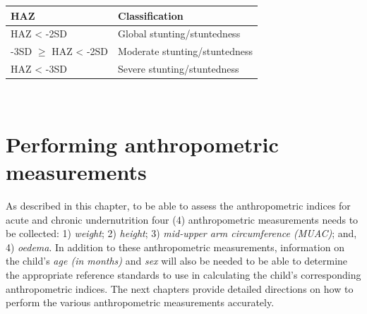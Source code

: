 \documentclass[12pt,]{book}
\theoremstyle{definition}
\theoremstyle{definition}
\theoremstyle{definition}
\theoremstyle{remark}
\begin{document}
\begin{longtable}[]{@{}ll@{}}
\toprule
\begin{minipage}[b]{0.34\columnwidth}\raggedright
\textbf{HAZ}\strut
\end{minipage} & \begin{minipage}[b]{0.47\columnwidth}\raggedright
\textbf{Classification}\strut
\end{minipage}\tabularnewline
\midrule
\endhead
\begin{minipage}[t]{0.34\columnwidth}\raggedright
HAZ \textless{} -2SD\strut
\end{minipage} & \begin{minipage}[t]{0.47\columnwidth}\raggedright
Global stunting/stuntedness\strut
\end{minipage}\tabularnewline
\begin{minipage}[t]{0.34\columnwidth}\raggedright
-3SD \(\geq\) HAZ \textless{} -2SD\strut
\end{minipage} & \begin{minipage}[t]{0.47\columnwidth}\raggedright
Moderate stunting/stuntedness\strut
\end{minipage}\tabularnewline
\begin{minipage}[t]{0.34\columnwidth}\raggedright
HAZ \textless{} -3SD\strut
\end{minipage} & \begin{minipage}[t]{0.47\columnwidth}\raggedright
Severe stunting/stuntedness\strut
\end{minipage}\tabularnewline
\bottomrule
\end{longtable}

~

\hypertarget{performing-anthropometric-measurements}{%
\section{Performing anthropometric
measurements}\label{performing-anthropometric-measurements}}

As described in this chapter, to be able to assess the anthropometric
indices for acute and chronic undernutrition four (4) anthropometric
measurements needs to be collected: 1) \emph{weight}; 2) \emph{height};
3) \emph{mid-upper arm circumference (MUAC)}; and, 4) \emph{oedema}. In
addition to these anthropometric measurements, information on the
child's \emph{age (in months)} and \emph{sex} will also be needed to be
able to determine the appropriate reference standards to use in
calculating the child's corresponding anthropometric indices. The next
chapters provide detailed directions on how to perform the various
anthropometric measurements accurately.
\end{document}
